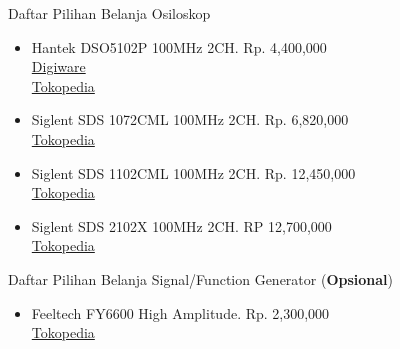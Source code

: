 \documentclass[table,dvipsnames]{beamer}
\begin{document}
	\begin{frame}
		\begin{exampleblock}{Daftar Pilihan Belanja Osiloskop}
			\begin{itemize}
				\item Hantek DSO5102P 100MHz 2CH. Rp. 4,400,000\\
				\href{https://digiwarestore.com/id/oscilloscopes/digital-storage-oscilloscope-hantek-dso5102p-osiloskop-100mhz-2-ch-641135.html}{Digiware}\\
				\href{https://www.tokopedia.com/digiware/digital-storage-oscilloscope-hantek-dso5102p-osiloskop-100mhz-2-ch}{Tokopedia}
				
				\item Siglent SDS 1072CML 100MHz 2CH. Rp. 6,820,000\\
				\href{https://www.tokopedia.com/tomas123/siglent-sds-1072cml}{Tokopedia}
				
				\item Siglent SDS 1102CML 100MHz 2CH. Rp. 12,450,000\\
				\href{https://www.tokopedia.com/tomas123/siglent-sds-1072cml}{Tokopedia}
				
				\item Siglent SDS 2102X 100MHz 2CH. RP 12,700,000\\
				\href{https://www.tokopedia.com/infinity226/super-phosphor-oscilloscope-siglent-sds2102x}{Tokopedia}
			\end{itemize}
		\end{exampleblock}
	
		\begin{exampleblock}{Daftar Pilihan Belanja Signal/Function Generator (\textbf{Opsional})}
			\begin{itemize}
				\item Feeltech FY6600 High Amplitude. Rp. 2,300,000\\
				\href{https://www.tokopedia.com/digilifeweb/signal-function-generator-feeltech-fy6600-60m-60mhz-dds-fy6600-60m}{Tokopedia}
			\end{itemize}
		\end{exampleblock}
	\end{frame}
	
\end{document}
